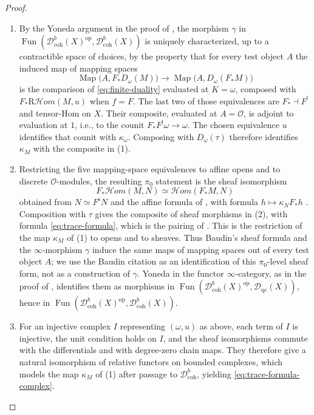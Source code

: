 \documentclass[11pt]{amsart}
\newcommand{\cO}{\mathcal{O}}
\newcommand{\Map}{\operatorname{Map}}
\newcommand{\op}{{\operatorname{op}}}
\DeclareMathOperator{\Fun}{\mathrm{Fun}}
\newcommand{\shHom}{\mathcal Hom}
\newcommand{\RHom}{\mathrm R\mathcal Hom}
\newcommand{\Dqc}{\mathcal D_{\mathrm{qc}}}
\newcommand{\Dbc}{\mathcal D^b_{\mathrm{coh}}}
\theoremstyle{plain}
\theoremstyle{definition}
\numberwithin{equation}{section}
\begin{document}
\begin{proof}
\begin{enumerate}
\item
By the Yoneda argument in the proof of , the morphism $\gamma$ in $\Fun(\Dbc(X)^{\op},\Dbc(X))$ is uniquely characterized, up to a contractible space of choices, by the property that for every test object $A$ the induced map of mapping spaces
\[
 \Map\bigl(A,F_*D_\omega(M)\bigr)
 \longrightarrow
 \Map\bigl(A,D_\omega(F_*M)\bigr)
\]
is the comparison of \eqref{eq:finite-duality} evaluated at $K=\omega$, composed with $F_*\RHom(M,u)$ when $f=F$.
The last two of those equivalences are $F_*\dashv F^!$ and tensor-Hom on $X$.
Their composite, evaluated at $A=\cO$, is adjoint to evaluation at $1$, i.e., to the counit $F_*F^!\omega\to\omega$.
The chosen equivalence $u$ identifies that counit with $\kappa_\omega$.
Composing with $D_\omega(\tau)$ therefore identifies $\kappa_M$ with the composite in \textup{(1)}.
\item
Restricting the five mapping-space equivalences to affine opens and to discrete $\cO$-modules, the resulting $\pi_0$ statement is the sheaf isomorphism
\[
 F_*\shHom(M,N)\simeq\shHom(F_*M,N)
\]
obtained from $N\simeq F^\flat N$ and the affine formula of , with formula $h\mapsto\kappa_NF_*h$ \cite[Lemma 3.4.1, first item and formula (3.4.1.c)]{Bau}.
Composition with $\tau$ gives the composite of sheaf morphisms in \textup{(2)}, with formula \eqref{eq:trace-formula}, which is the pairing of \cite[Construction 4.1.1]{Bau}.
This is the restriction of the map $\kappa_M$ of \textup{(1)} to opens and to sheaves.
Thus Baudin's sheaf formula and the $\infty$-morphism $\gamma$ induce the same maps of mapping spaces out of every test object $A$; we use the Baudin citation as an identification of this $\pi_0$-level sheaf form, not as a construction of $\gamma$.
Yoneda in the functor $\infty$-category, as in the proof of , identifies them as morphisms in $\Fun(\Dbc(X)^{\op},\Dqc(X))$, hence in $\Fun(\Dbc(X)^{\op},\Dbc(X))$.
\item
For an injective complex $I$ representing $(\omega,u)$ as above, each term of $I$ is injective, the unit condition holds on $I$, and the sheaf isomorphisms commute with the differentials and with degree-zero chain maps.
They therefore give a natural isomorphism of relative functors on bounded complexes, which models the map $\kappa_M$ of \textup{(1)} after passage to $\Dbc$, yielding \eqref{eq:trace-formula-complex}.
\end{enumerate}
\end{proof}
\end{document}
